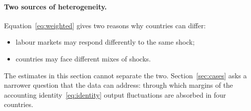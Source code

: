 \paragraph{Two sources of heterogeneity.} Equation~\eqref{eq:weighted} gives two reasons why
countries can differ:
\begin{itemize}
  \item labour markets may respond differently to the same shock;
  \item countries may face different mixes of shocks.
\end{itemize}
The estimates in this section cannot separate the two. Section~\ref{sec:cases} asks a
narrower question that the data can address: through which margins of the accounting
identity~\eqref{eq:identity} output fluctuations are absorbed in four countries.
